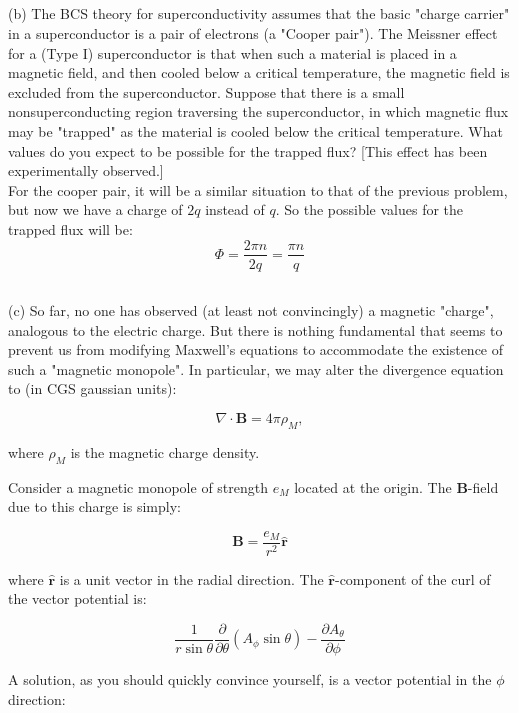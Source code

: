 \documentclass[12pt]{article}
\begin{document}
\subsection{}
(b) The BCS theory for superconductivity assumes that the basic "charge carrier" in a superconductor is a pair of electrons (a "Cooper pair"). The Meissner effect for a (Type I) superconductor is that when such a material is placed in a magnetic field, and then cooled below a critical temperature, the magnetic field is excluded from the superconductor. Suppose that there is a small nonsuperconducting region traversing the superconductor, in which magnetic flux may be "trapped" as the material is cooled below the critical temperature. What values do you expect to be possible for the trapped flux? [This effect has been experimentally observed.]\\
For the cooper pair, it will be a similar situation to that of the previous problem, but now we have a charge of $2q$ instead of $q$. So the possible values for the trapped flux will be:
\begin{equation}
\Phi = \frac{2 \pi n}{2q} = \frac{\pi n}{q} 
\end{equation}
\subsection{}
(c) So far, no one has observed (at least not convincingly) a magnetic "charge", analogous to the electric charge. But there is nothing fundamental that seems to prevent us from modifying Maxwell's equations to accommodate the existence of such a "magnetic monopole". In particular, we may alter the divergence equation to (in CGS gaussian units):

$$
\nabla \cdot \boldsymbol{B}=4 \pi \rho_{M},
$$

where $\rho_{M}$ is the magnetic charge density.

Consider a magnetic monopole of strength $e_{M}$ located at the origin. The $\boldsymbol{B}$-field due to this charge is simply:

$$
\boldsymbol{B}=\frac{e_{M}}{r^{2}} \hat{\boldsymbol{r}}
$$

where $\hat{\boldsymbol{r}}$ is a unit vector in the radial direction. The $\hat{\boldsymbol{r}}$-component of the curl of the vector potential is:

$$
\frac{1}{r \sin \theta} \frac{\partial}{\partial \theta}\left(A_{\phi} \sin \theta\right)-\frac{\partial A_{\theta}}{\partial \phi}
$$

A solution, as you should quickly convince yourself, is a vector potential in the $\phi$ direction:
\end{document}
